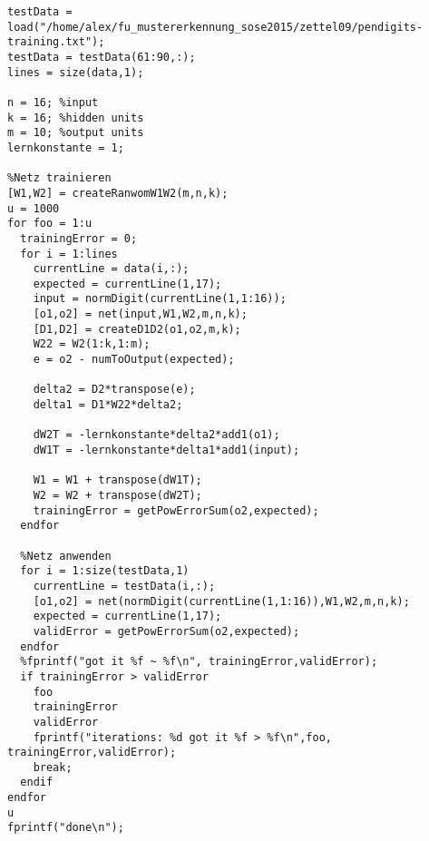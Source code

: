 \documentclass[a4paper,10pt]{article}
\begin{document}
\begin{lstlisting}
testData = load("/home/alex/fu_mustererkennung_sose2015/zettel09/pendigits-training.txt");
testData = testData(61:90,:);
lines = size(data,1);

n = 16; %input
k = 16; %hidden units
m = 10; %output units
lernkonstante = 1;

%Netz trainieren
[W1,W2] = createRanwomW1W2(m,n,k);
u = 1000
for foo = 1:u
  trainingError = 0;
  for i = 1:lines
    currentLine = data(i,:);
    expected = currentLine(1,17);
    input = normDigit(currentLine(1,1:16));
    [o1,o2] = net(input,W1,W2,m,n,k);
    [D1,D2] = createD1D2(o1,o2,m,k);
    W22 = W2(1:k,1:m);
    e = o2 - numToOutput(expected);
    
    delta2 = D2*transpose(e);
    delta1 = D1*W22*delta2;
    
    dW2T = -lernkonstante*delta2*add1(o1);
    dW1T = -lernkonstante*delta1*add1(input);

    W1 = W1 + transpose(dW1T);
    W2 = W2 + transpose(dW2T);
    trainingError = getPowErrorSum(o2,expected);
  endfor
  
  %Netz anwenden
  for i = 1:size(testData,1)
    currentLine = testData(i,:);
    [o1,o2] = net(normDigit(currentLine(1,1:16)),W1,W2,m,n,k);
    expected = currentLine(1,17);
    validError = getPowErrorSum(o2,expected);
  endfor
  %fprintf("got it %f ~ %f\n", trainingError,validError);
  if trainingError > validError
    foo
    trainingError
    validError
    fprintf("iterations: %d got it %f > %f\n",foo, trainingError,validError);
    break;
  endif
endfor
u
fprintf("done\n");
\end{lstlisting}
\end{document}
